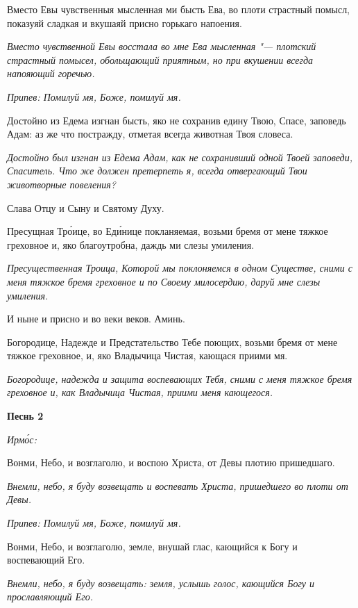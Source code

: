 Вместо Евы чувственныя мысленная ми бысть Ева, во плоти страстный помысл, показуяй сладкая и вкушаяй присно горькаго напоения.


\itshape Вместо чувственной Евы восстала во мне Ева мысленная "--- плотский страстный помысел, обольщающий приятным, но при вкушении всегда напояющий горечью.\normalfont{}


\itshape Припев:\normalfont{} Помилуй мя, Боже, помилуй мя.


Достойно из Едема изгнан бысть, яко не сохранив едину Твою, Спасе, заповедь Адам: аз же что постражду, отметая всегда животная Твоя словеса.


\itshape Достойно был изгнан из Едема Адам, как не сохранивший одной Твоей заповеди, Спаситель. Что же должен претерпеть я, всегда отвергающий Твои животворные повеления?\normalfont{}


Слава Отцу и Сыну и Святому Духу.


Пресущная Тро́ице, во Еди́нице покланяемая, возьми бремя от мене тяжкое греховное и, яко благоутробна, даждь ми слезы умиления.


\itshape Пресущественная Троица, Которой мы поклоняемся в одном Существе, сними с меня тяжкое бремя греховное и по Своему милосердию, даруй мне слезы умиления.\normalfont{}


И ныне и присно и во веки веков. Аминь.


Богородице, Надежде и Предстательство Тебе поющих, возьми бремя от мене тяжкое греховное, и, яко Владычица Чистая, кающася приими мя.


\itshape Богородице, надежда и защита воспевающих Тебя, сними с меня тяжкое бремя греховное и, как Владычица Чистая, приими меня кающегося.\normalfont{}





\bfseries Песнь 2\normalfont{}


\itshape Ирмо́с:\normalfont{}


Вонми, Небо, и возглаголю, и воспою Христа, от Девы плотию пришедшаго.


\itshape Внемли, небо, я буду возвещать и воспевать Христа, пришедшего во плоти от Девы.\normalfont{}


\itshape Припев:\normalfont{} Помилуй мя, Боже, помилуй мя.


Вонми, Небо, и возглаголю, земле, внушай глас, кающийся к Богу и воспевающий Его.


\itshape Внемли, небо, я буду возвещать: земля, услышь голос, кающийся Богу и прославляющий Его.\normalfont{}


